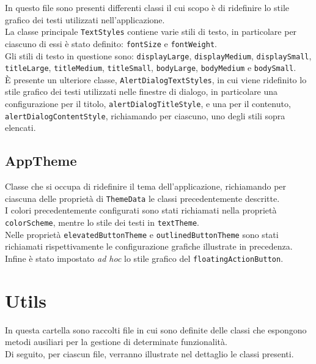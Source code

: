 In questo file sono presenti differenti classi il cui scopo è di ridefinire lo stile grafico dei testi utilizzati nell'applicazione. \\
La classe principale \lstinline{TextStyles} contiene varie stili di testo, in particolare per ciascuno di essi è stato definito: \lstinline{fontSize}\cite{site:font-size} e \lstinline{fontWeight}\cite{site:font-weight}. \\
Gli stili di testo\cite{site:text-theme} in questione sono:
 \lstinline{displayLarge},
 \lstinline{displayMedium},
 \lstinline{displaySmall},
 \lstinline{titleLarge},
 \lstinline{titleMedium},
 \lstinline{titleSmall},
 \lstinline{bodyLarge},
 \lstinline{bodyMedium} e
 \lstinline{bodySmall}. \\
 È presente un ulteriore classe, \lstinline{AlertDialogTextStyles}, in cui viene ridefinito lo stile grafico dei testi utilizzati nelle finestre di dialogo, in particolare una configurazione per il titolo, \lstinline{alertDialogTitleStyle}, e una per il contenuto, \lstinline{alertDialogContentStyle}, richiamando per ciascuno, uno degli stili sopra elencati.

 \subsection{AppTheme}
\label{subsec:app-theme}

Classe che si occupa di ridefinire il tema dell'applicazione, richiamando per ciascuna delle proprietà di \lstinline{ThemeData}\cite{site:theme-data-class} le classi precedentemente descritte. \\
I colori precedentemente configurati sono stati richiamati nella proprietà \lstinline{colorScheme}, mentre lo stile dei testi in \lstinline{textTheme}. \\
Nelle proprietà \lstinline{elevatedButtonTheme} e \lstinline{outlinedButtonTheme} sono stati richiamati rispettivamente le configurazione grafiche illustrate in precedenza.\\
Infine è stato impostato \emph{ad hoc} lo stile grafico del \lstinline{floatingActionButton}\cite{site:fab}.

\section{Utils}
\label{sec:utils}

In questa cartella sono raccolti file in cui sono definite delle classi che espongono metodi ausiliari per la gestione di determinate funzionalità. \\
Di seguito, per ciascun file, verranno illustrate nel dettaglio le classi presenti.


